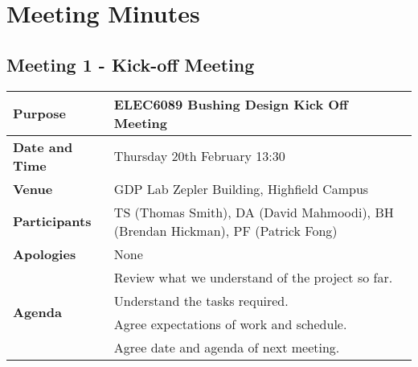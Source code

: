 
\section{Meeting Minutes}
\subsection{Meeting 1 - Kick-off Meeting}
\begin{center}
\begin{longtable}{| m{} | m{} |} \hline
\textbf{Purpose} & ELEC6089 Bushing Design Kick Off Meeting \\ \hline
\textbf{Date and Time} & Thursday 20th February 13:30 \\ \hline
\textbf{Venue} & GDP Lab Zepler Building, Highfield Campus \\ \hline
\textbf{Participants} & TS (Thomas Smith), DA (David Mahmoodi), BH (Brendan Hickman), PF (Patrick Fong)\\ \hline
\textbf{Apologies} &None \\ \hline
\multirow{4}{*}{\textbf{Agenda}} & Review what we understand of the project so far. \\
 & Understand the tasks required. \\ 
 & Agree expectations of work and schedule. \\
 & Agree date and agenda of next meeting. \\ \hline
\end{longtable}
\end{center}

